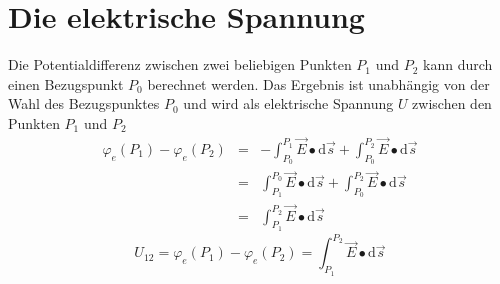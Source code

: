 \section{Die elektrische Spannung}
Die Potentialdifferenz zwischen zwei beliebigen Punkten $P_1$ und $P_2$ kann durch einen Bezugspunkt $P_0$ berechnet werden. Das Ergebnis ist unabhängig von der Wahl des Bezugspunktes $P_0$ und wird als elektrische Spannung $U$ zwischen den Punkten $P_1$ und $P_2$ 
\begin{equation}
\boxed{
\begin{array}{lll}
\varphi_e\left(P_1\right)-\varphi_e\left(P_2\right)&=&-\displaystyle \int_{P_0}^{P_1}\overrightarrow{E}\bullet\text{d}\overrightarrow{s}+\displaystyle \int_{P_0}^{P_2}\overrightarrow{E}\bullet\text{d}\overrightarrow{s}\\
&=&\displaystyle \int_{P_1}^{P_0}\overrightarrow{E}\bullet\text{d}\overrightarrow{s}+\displaystyle \int_{P_0}^{P_2}\overrightarrow{E}\bullet\text{d}\overrightarrow{s}\\
&=&\displaystyle \int_{P_1}^{P_2}\overrightarrow{E}\bullet\text{d}\overrightarrow{s}
\end{array}}
\end{equation}
\begin{equation}
\boxed{U_{12}=\varphi_e\left(P_1\right)-\varphi_e\left(P_2\right)=\displaystyle \int_{P_1}^{P_2}\overrightarrow{E}\bullet\text{d}\overrightarrow{s}}
\end{equation}
